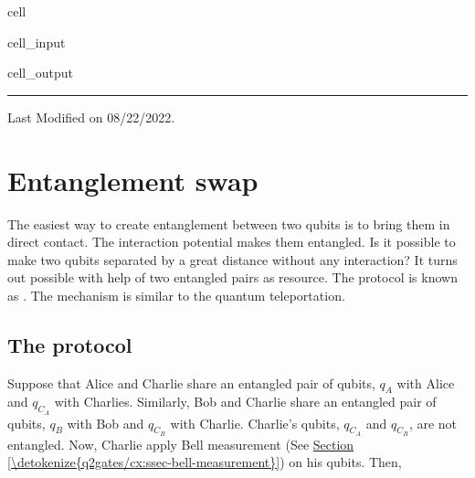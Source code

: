 \documentclass[letterpaper,10pt,english]{jupyterBook}
\begin{document}
\begin{sphinxuseclass}{cell}\begin{sphinxVerbatimInput}

\begin{sphinxuseclass}{cell_input}
\begin{sphinxVerbatim}[commandchars=\\\{\}]
\end{sphinxVerbatim}

\end{sphinxuseclass}\end{sphinxVerbatimInput}
\begin{sphinxVerbatimOutput}

\begin{sphinxuseclass}{cell_output}
\noindent{}

\end{sphinxuseclass}\end{sphinxVerbatimOutput}

\end{sphinxuseclass}

\bigskip\hrule\bigskip


\sphinxAtStartPar
Last Modified on 08/22/2022.

\sphinxstepscope


\section{Entanglement swap}
\label{\detokenize{algorithms/entanglement-swap:entanglement-swap}}\label{\detokenize{algorithms/entanglement-swap::doc}}
\sphinxAtStartPar
The easiest way to create entanglement between two qubits is to bring them in direct contact.  The interaction potential makes them entangled.  Is it possible to make two qubits separated by a great distance without any interaction?  It turns out possible with help of two entangled pairs as resource.  The protocol is known as .  The mechanism is similar to the quantum teleportation.


\subsection{The protocol}
\label{\detokenize{algorithms/entanglement-swap:the-protocol}}
\sphinxAtStartPar
Suppose that Alice and Charlie share an entangled pair of qubits, \(q_A\) with Alice and \(q_{C_A}\) with Charlies.  Similarly, Bob and  Charlie share an entangled pair of qubits, \(q_B\) with Bob and \(q_{C_B}\) with Charlie.   Charlie’s qubits, \(q_{C_A}\) and \(q_{C_B}\), are not entangled.  Now, Charlie apply Bell measurement (See \hyperref[\detokenize{q2gates/cx:ssec-bell-measurement}]{Section \ref{\detokenize{q2gates/cx:ssec-bell-measurement}}})  on his qubits.  Then,
\end{document}
